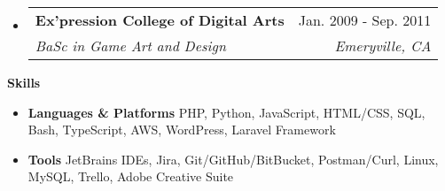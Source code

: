 \documentclass[letterpaper,10pt]{article}[leftmargin=*]
\makeatletter
\def \entryspacing {-0pt}
\renewcommand{\section}[2]{\vspace{5pt}
  \colorbox{secondary}{\color{white}\raggedbottom\normalsize\textbf{{#1}{\hspace{7pt}#2}}}
}
\newcommand{\resumeEntryStart}{\begin{itemize}[leftmargin=2.5mm]}
\newcommand{\resumeEntryEnd}{\end{itemize}\vspace{\entryspacing}}
\newcommand{\resumeEntryTSDL}[4]{
  \vspace{-1pt}\item[]
    \begin{tabularx}{0.97\textwidth}{X@{\hspace{60pt}}r}
      \textbf{\color{primary}#1} & {\firabook\color{accent}\small#2} \\
      \textit{\color{accent}\small#3} & \textit{\color{accent}\small#4} \\
    \end{tabularx}\vspace{-6pt}
}
\newcommand{\resumeEntryS}[2]{
  \item[]\small{
    \textbf{\color{primary}#1 }{ #2 \vspace{-6pt}}
  }
}
\makeatother
\begin{document}
  \resumeEntryStart
    \resumeEntryTSDL
      {Ex’pression College of Digital Arts}{Jan. 2009 - Sep. 2011}
      {BaSc in Game Art and Design}{Emeryville, CA}
  \resumeEntryEnd

\section{\faGears}{Skills}
 \resumeEntryStart
  \resumeEntryS{Languages \& Platforms} { PHP, Python, JavaScript, HTML/CSS, SQL, Bash, TypeScript, AWS, WordPress, Laravel Framework}
  \resumeEntryS{Tools } {JetBrains IDEs, Jira, Git/GitHub/BitBucket, Postman/Curl, Linux, MySQL, Trello, Adobe Creative Suite}
 \resumeEntryEnd
\end{document}
